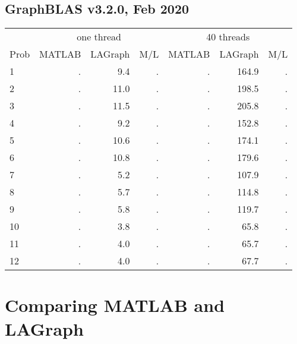 \documentclass[12pt]{article}
\begin{document}
\subsection{GraphBLAS v3.2.0, Feb 2020}

{\small
\begin{tabular}{l|rr|r||rr|r}
\hline
     & \multicolumn{3}{c}{one thread}                &  \multicolumn{3}{c}{40 threads}  \\
Prob & MATLAB         & LAGraph        & M/L         &   MATLAB      & LAGraph       & M/L        \\
\hline
  1  &{           .  }& {         9.4 }&        .    &  {        .  }& {      164.9 }&      .     \\
  2  &{           .  }& {        11.0 }&        .    &  {        .  }& {      198.5 }&      .     \\
  3  &{           .  }& {        11.5 }&        .    &  {        .  }& {      205.8 }&      .     \\
\hline
  4  &{           .  }& {         9.2 }&        .    &  {        .  }& {      152.8 }&      .     \\
  5  &{           .  }& {        10.6 }&        .    &  {        .  }& {      174.1 }&      .     \\
  6  &{           .  }& {        10.8 }&        .    &  {        .  }& {      179.6 }&      .     \\
\hline
  7  &{           .  }& {         5.2 }&        .    &  {        .  }& {      107.9 }&      .     \\
  8  &{           .  }& {         5.7 }&        .    &  {        .  }& {      114.8 }&      .     \\
  9  &{           .  }& {         5.8 }&        .    &  {        .  }& {      119.7 }&      .     \\
\hline
 10  &{           .  }& {         3.8 }&        .    &  {        .  }& {       65.8 }&      .     \\
 11  &{           .  }& {         4.0 }&        .    &  {        .  }& {       65.7 }&      .     \\
 12  &{           .  }& {         4.0 }&        .    &  {        .  }& {       67.7 }&      .     \\
\end{tabular}
}

\section{Comparing MATLAB and LAGraph}
\end{document}

